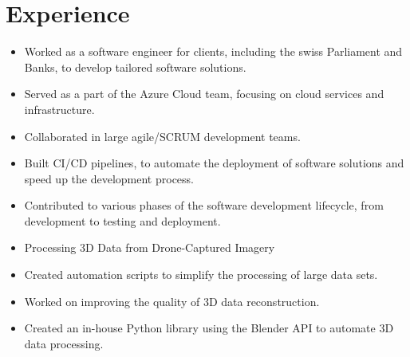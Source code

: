 \section{Experience}
\begin{itemize}
\item Worked as a software engineer for clients, including the swiss Parliament and Banks, to develop tailored software solutions.
\item Served as a part of the Azure Cloud team, focusing on cloud services and infrastructure.
\item Collaborated in large agile/SCRUM development teams.
\item Built CI/CD pipelines, to automate the deployment of software solutions and speed up the development process.
\item Contributed to various phases of the software development lifecycle, from development to testing and deployment.
\end{itemize}
\dottedline
\vspace{-1em}
\begin{itemize}
\item Processing 3D Data from Drone-Captured Imagery
\item Created automation scripts to simplify the processing of large data sets.
\item Worked on improving the quality of 3D data reconstruction.
\item Created an in-house Python library using the Blender API to automate 3D data processing.
\end{itemize}